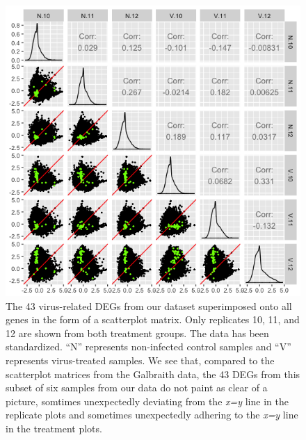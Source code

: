 \documentclass[11pt,a4paper,oldfontcommands,openany]{memoir}
\numberwithin{equation}{section} %
\begin{document}
\begin{figure}[H]
  \includegraphics[width=\textwidth]{Images/RutterSM4}
  \caption{The 43 virus-related DEGs from our dataset superimposed onto all genes in the form of a scatterplot matrix. Only replicates 10, 11, and 12 are shown from both treatment groups. The data has been standardized. ``N'' represents non-infected control samples and ``V'' represents virus-treated samples. We see that, compared to the scatterplot matrices from the Galbraith data, the 43 DEGs from this subset of six samples from our data do not paint as clear of a picture, somtimes unexpectedly deviating from the \textit{x=y} line in the replicate plots and sometimes unexpectedly adhering to the \textit{x=y} line in the treatment plots.}
  \label{fig:RutterSM4}
\end{figure}
\end{document}
